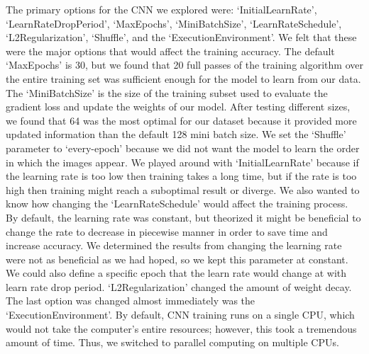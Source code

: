 \documentclass[conference]{IEEEtran}
\begin{document}
The primary options for the CNN we explored were: ‘InitialLearnRate’, ‘LearnRateDropPeriod’, ‘MaxEpochs’, ‘MiniBatchSize’, ‘LearnRateSchedule’, ‘L2Regularization’, ‘Shuffle’, and the ‘ExecutionEnvironment’. We felt that these were the major options that would affect the training accuracy. The default ‘MaxEpochs’ is 30, but we found that 20 full passes of the training algorithm over the entire training set was sufficient enough for the model to learn from our data. The ‘MiniBatchSize’ is the size of the training subset used to evaluate the gradient loss and update the weights of our model. After testing different sizes, we found that 64 was the most optimal for our dataset because it provided more updated information than the default 128 mini batch size. We set the ‘Shuffle’ parameter to ‘every-epoch’ because we did not want the model to learn the order in which the images appear. We played around with ‘InitialLearnRate’ because if the learning rate is too low then training takes a long time, but if the rate is too high then training might reach a suboptimal result or diverge. We also wanted to know how changing the ‘LearnRateSchedule’ would affect the training process. By default, the learning rate was constant, but theorized it might be beneficial to change the rate to decrease in piecewise manner in order to save time and increase accuracy. We determined the results from changing the learning rate were not as beneficial as we had hoped, so we kept this parameter at constant. We could also define a specific epoch that the learn rate would change at with learn rate drop period. ‘L2Regularization’ changed the amount of weight decay. The last option was changed almost immediately was the ‘ExecutionEnvironment’. By default, CNN training runs on a single CPU, which would not take the computer’s entire resources; however, this took a tremendous amount of time. Thus, we switched to parallel computing on multiple CPUs.
\end{document}
